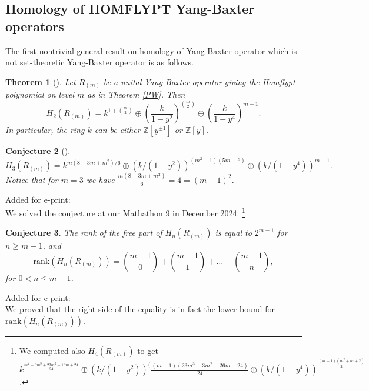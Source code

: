 \documentclass[12pt]{amsart}
\newtheorem{theorem}{Theorem}[section]
\newtheorem{conjecture}[theorem]{Conjecture}
\begin{document}
\subsection{Homology of HOMFLYPT Yang-Baxter operators} 
The first nontrivial general result on homology of Yang-Baxter operator which 
is not set-theoretic Yang-Baxter operator is as follows. 
\begin{theorem}[\cite{PrWa2}]\label{PW2}
Let $R_{(m)}$ be a unital Yang-Baxter operator giving the Homflypt polynomial on level $m$ as in Theorem \ref{PW}. Then
\begin{equation*}
H_{2}(R_{(m)})={k}^{1+ \binom{m}{2}} \oplus \left( \dfrac{{k}}{1-y^{2}} \right)^{\binom{m}{2}} \oplus  \left( \dfrac{{k}}{1-y^{4}} \right)^{m-1}.
\end{equation*}
In particular, the ring ${k}$ can be either $\mathbb{Z}[y^{\pm 1}]$ or $\mathbb{Z}[y]$.
\end{theorem}


\begin{conjecture}[\cite{PrWa2}]
\begin{equation*}
H_3(R_{(m)})=k^{m(8-3m+m^2)/6} \oplus (k/(1-y^2))^{(m^2-1)(5m-6)} \oplus (k/(1-y^4))^{m-1}.
\end{equation*}
Notice that for $m=3$ we have 
$\frac{m(8-3m+m^2)}{6}=4=(m-1)^2$.
\end{conjecture}

{\color{red} Added for e-print:\\ We solved the conjecture at our Mathathon 9 in December 2024. \footnote{We computed also $H_4(R_{(m)})$ to get \\ $k^{\frac{m^4 - 6m^3 + 23m^2 - 18m + 24}{24}}\oplus (k/(1-y^2))^(\frac{(m-1)(23m^{3}-3m^{2}-26m+24)}{24} \oplus (k/(1-y^4))^{\frac{(m-1)(m^2+m+2)}{2}}$. }}


\begin{conjecture}\cite{PrWa3}
The rank of the free part of $H_n(R_{(m)})$ 
is equal to $2^{m-1}$ for $n\geq m-1$, and
\begin{equation*}
\mathrm{rank} (H_n(R_{(m)})) = \binom{m-1}{0} + \binom{m-1}{1} +\ldots + \binom{m-1}{n},  
\end{equation*}
for $0<n\leq m-1$.
\end{conjecture}

{\color{red} Added for e-print:\\ We proved that the right side of the equality is in fact the lower bound for $\mathrm{rank} (H_n(R_{(m)}))$.} 
\end{document}
